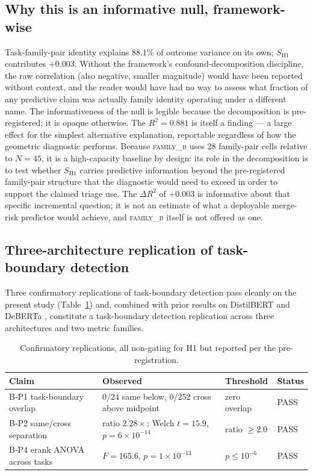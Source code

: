 \documentclass[10pt]{article}
\begin{document}
\subsection{Why this is an informative null, framework-wise}

Task-family-pair identity explains 88.1\% of outcome variance on
its own; $S_{\mathrm{H1}}$ contributes $+0.003$. Without the
framework's confound-decomposition discipline, the raw correlation
(also negative, smaller magnitude) would have been reported without
context, and the reader would have had no way to assess what
fraction of any predictive claim was actually family identity
operating under a different name. The informativeness of the null
is legible because the decomposition is pre-registered; it is
opaque otherwise. The $R^2 = 0.881$ is itself a finding --- a large
effect for the simplest alternative explanation, reportable
regardless of how the geometric diagnostic performs.
Because \textsc{family\_b} uses 28 family-pair cells relative to
$N = 45$, it is a high-capacity baseline by design: its role in the
decomposition is to test whether $S_{\mathrm{H1}}$ carries
predictive information beyond the pre-registered family-pair
structure that the diagnostic would need to exceed in order to
support the claimed triage use. The $\Delta R^2$ of $+0.003$ is
informative about that specific incremental question; it is not an
estimate of what a deployable merge-risk predictor would achieve,
and \textsc{family\_b} itself is not offered as one.

\subsection{Three-architecture replication of task-boundary detection}
\label{sec:empirical-replication}

Three confirmatory replications of task-boundary detection pass
cleanly on the present study (Table~\ref{tab:replications}) and, combined with
prior results on DistilBERT \citep{anonymized2026smallencoder} and DeBERTa
\citep{anonymized2026midencoder}, constitute a task-boundary detection
replication across three architectures and two metric families.

\begin{table}[h]
  \centering
  \small
  \begin{tabular}{llll}
    \toprule
    Claim & Observed & Threshold & Status \\
    \midrule
    B-P1 task-boundary overlap & 0/24 same below, 0/252 cross above midpoint & zero overlap & PASS \\
    B-P2 same/cross separation & ratio $2.28\times$; Welch $t=15.9$, $p=6{\times}10^{-14}$ & ratio $\geq 2.0$ & PASS \\
    B-P4 erank ANOVA across tasks & $F = 165.6$, $p = 1{\times}10^{-13}$ & $p \leq 10^{-6}$ & PASS \\
    \bottomrule
  \end{tabular}
  \caption{Confirmatory replications, all non-gating for H1 but
    reported per the pre-registration.}
  \label{tab:replications}
\end{table}
\end{document}
